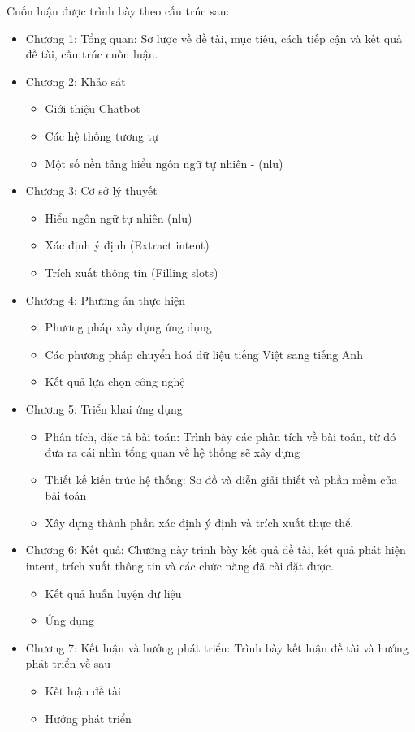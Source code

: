 Cuốn luận được trình bày theo cấu trúc sau:
\begin{itemize}
    \item Chương 1: Tổng quan: Sơ lược về đề tài, mục tiêu, cách tiếp cận và kết quả đề tài, cấu trúc cuốn luận.
    \item Chương 2: Khảo sát
          \begin{itemize}
              \item Giới thiệu Chatbot
              \item Các hệ thống tương tự
              \item Một số nền tảng hiểu ngôn ngữ tự nhiên - (\ac{nlu})
          \end{itemize}
    \item Chương 3: Cơ sở lý thuyết
          \begin{itemize}
              \item Hiểu ngôn ngữ tự nhiên (\ac{nlu})
              \item Xác định ý định (Extract intent)
              \item Trích xuất thông tin (Filling slots)
          \end{itemize}
    \item Chương 4: Phương án thực hiện
    \begin{itemize}
        \item Phương pháp xây dựng ứng dụng
        \item Các phương pháp chuyển hoá dữ liệu tiếng Việt sang tiếng Anh
        \item Kết quả lựa chọn công nghệ
    \end{itemize}
    \item Chương 5: Triển khai ứng dụng
          \begin{itemize}
              \item Phân tích, đặc tả bài toán: Trình bày các phân tích về bài toán, từ đó đưa ra cái nhìn tổng quan về hệ thống sẽ xây dựng
              \item Thiết kế kiến trúc hệ thống: Sơ đồ và diễn giải thiết và phần mềm của bài toán
              \item Xây dựng thành phần xác định ý định và trích xuất thực thể.
          \end{itemize}
    \item Chương 6: Kết quả: Chương này trình bày kết quả đề tài, kết quả phát hiện intent, trích xuất thông tin và các chức năng đã cài đặt được.
          \begin{itemize}
              \item Kết quả huấn luyện dữ liệu 
              \item Ứng dụng
          \end{itemize}
    \item Chương 7: Kết luận và hướng phát triển: Trình bày kết luận đề tài và hướng phát triển về sau
          \begin{itemize}
              \item Kết luận đề tài
              \item Hướng phát triển
          \end{itemize}
\end{itemize}